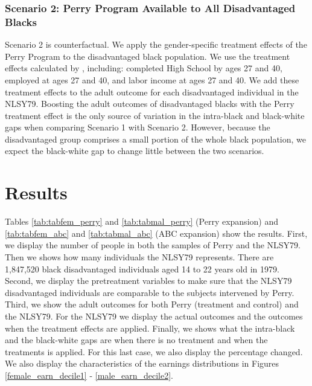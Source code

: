 \subsubsection*{Scenario 2: Perry Program Available to All Disadvantaged Blacks}
Scenario 2 is counterfactual. We apply the gender-specific treatment effects of the Perry Program to the disadvantaged black population. We use the treatment effects calculated by \citet{heckman2010analyzing}, including: completed High School by ages 27 and 40, employed at ages 27 and 40, and labor income at ages 27 and 40. We add these treatment effects to the adult outcome for each disadvantaged individual in the NLSY79. Boosting the adult outcomes of disadvantaged blacks with the Perry treatment effect is the only source of variation in the intra-black and black-white gaps when comparing Scenario 1 with Scenario 2. However, because the disadvantaged group comprises a small portion of the whole black population, we expect the black-white gap to change little between the two scenarios.


\section{Results}
Tables \ref{tab:tabfem_perry} and \ref{tab:tabmal_perry} (Perry expansion) and \ref{tab:tabfem_abc} and \ref{tab:tabmal_abc} (ABC expansion) show the results. First, we display the number of people in both the samples of Perry and the NLSY79. Then we shows how many individuals the NLSY79 represents. There are 1,847,520 black disadvantaged individuals aged 14 to 22 years old in 1979. Second, we display the pretreatment variables to make sure that the NLSY79 disadvantaged individuals are comparable to the subjects intervened by Perry. Third, we show the adult outcomes for both Perry (treatment and control) and the NLSY79. For the NLSY79 we display the actual outcomes and the outcomes when the treatment effects are applied. Finally, we shows what the intra-black and the black-white gaps are when there is no treatment and when the treatments is applied. For this last case, we also display the percentage changed. We also display the characteristics of the earnings distributions in Figures \ref{female_earn_decile1} - \ref{male_earn_decile2}. 

\clearpage
{}




\restoregeometry


\restoregeometry




%

\medskip{}


\medskip{}


